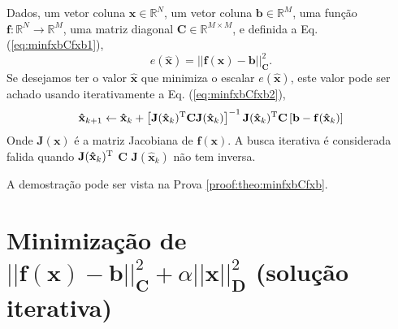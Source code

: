 \begin{theorem}\label{theo:minfxbCfxb}
Dados,
um vetor coluna $\mathbf{x}\in \mathbb{R}^N$, 
um vetor coluna $\mathbf{b}\in \mathbb{R}^M$,  
uma função $\mathbf{f}:\mathbb{R}^{N} \rightarrow \mathbb{R}^{M}$, 
uma matriz diagonal $\mathbf{C} \in \mathbb{R}^{M\times M}$, e 
definida a Eq. (\ref{eq:minfxbCfxb1}),
\begin{equation}\label{eq:minfxbCfxb1}
e(\mathbf{\hat{x}})=||\mathbf{f}(\mathbf{x})-\mathbf{b}||_{\mathbf{C}}^2.
\end{equation}
Se desejamos ter o valor $\mathbf{\hat{x}}$ que minimiza o escalar $e(\mathbf{\hat{x}})$,
este valor pode ser achado usando iterativamente a Eq. (\ref{eq:minfxbCfxb2}),
\begin{equation}\label{eq:minfxbCfxb2}
\mathbf{\hat{x}}_{k+1} \leftarrow \mathbf{\hat{x}}_k+
\left[ \mathbf{J}(\mathbf{\hat{x}}_k)^{\mathrm{T}}\mathbf{C} \mathbf{J}(\mathbf{\hat{x}}_k) \right]^{-1}
 \mathbf{J}(\mathbf{\hat{x}}_k)^{\mathrm{T}}\mathbf{C}\left[\mathbf{b}-\mathbf{f}(\mathbf{\hat{x}}_k)\right]
\end{equation}
Onde  $\mathbf{J}(\mathbf{x})$ é a matriz Jacobiana de $\mathbf{f}(\mathbf{x})$.
A busca iterativa é considerada falida quando 
$\mathbf{J}(\mathbf{\hat{x}}_k)^{\mathrm{T}}$ $\mathbf{C}$ $\mathbf{J}(\mathbf{\hat{x}}_k)$
não tem inversa.

A demostração pode ser vista na Prova \ref{proof:theo:minfxbCfxb}.
\end{theorem}


\section{Minimização de $||\mathbf{f}(\mathbf{x})-\mathbf{b}||_{\mathbf{C}}^2+\alpha||\mathbf{x}||_{\mathbf{D}}^2$  
(solução iterativa)
}

